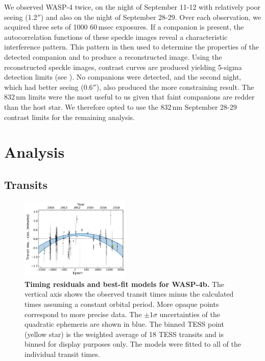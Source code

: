 \documentclass[12pt,twocolumn,tighten]{aastex62}
\begin{document}
We observed WASP-4 twice, on the night of September 11-12 with
relatively poor seeing (1.2$''$) and also on the night of September
28-29.  Over each observation, we acquired three sets of 1000
60$\,$msec exposures.  If a companion is present, the autocorrelation
functions of these speckle images reveal a characteristic interference
pattern. This pattern in then used to determine the properties of the
detected companion and to produce a reconstructed image.  Using the
reconstructed speckle images,  contrast curves are produced yielding
5-sigma detection limits  (see \citealt{howell_speckle_2011}).  No
companions were detected, and the second night, which had better
seeing (0.6$''$), also produced the more constraining result.  The
832$\,$nm limits were the most useful to us given that faint
companions are redder than the host star.  We therefore opted to use
the 832$\,$nm September 28-29 contrast limits for the remaining
analysis.


\section{Analysis}
\label{sec:analysis}

\subsection{Transits}
\label{sec:transit_analysis}

\begin{figure}[t]
	\begin{center}
		\leavevmode
		\includegraphics[width=0.47\textwidth]{f1.pdf}
	\end{center}
	\vspace{-0.7cm}
  \caption{ {\bf Timing residuals and best-fit models for WASP-4b.}
  The vertical axis shows the observed transit times minus the
  calculated times assuming a constant orbital period.  More opaque
  points correspond to more precise data.  The $\pm1\sigma$
  uncertainties of the quadratic ephemeris 
  are shown in blue.
  The binned TESS point (yellow star) is the weighted average of 18
  TESS transits and is binned for display purposes only.  The models
  were fitted to all of the individual transit times.
  \label{fig:times}
	}
\end{figure}
\end{document}
